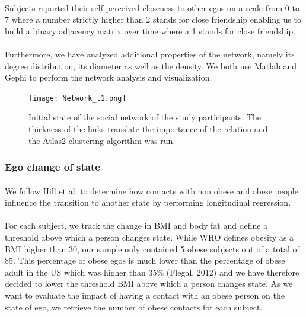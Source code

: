 \documentclass[11pt]{article}
\begin{document}
\paragraph{}
Subjects reported their self-perceived closeness to other egos on a scale from 0 to 7 where a number strictly higher than 2 stands for close friendship enabling us to build a binary adjacency matrix over time where a 1 stands for close friendship.

\paragraph{}

Furthermore, we have analyzed additional properties of the network, namely its degree distribution, its diameter as well as the density. We both use Matlab and Gephi to perform the network analysis and visualization.

\begin{figure}[!ht]
\center
   \texttt{[image: Network\_t1.png]}
   \caption{\label{4} Initial state of the social network of the study participants. The thickness of the links translate the importance of the relation and the Atlas2 clustering algorithm was run.}
\end{figure}

\subsubsection{Ego change of state}
\paragraph{}
We follow Hill et al. to determine how contacts with non obese and obese people influence the transition to another state by performing longitudinal regression. 
\paragraph{}
For each subject, we track the change in BMI and body fat and define a threshold above which a person changes state. While WHO defines obesity as a BMI higher than 30, our sample only contained 5 obese subjects out of a total of 85. This percentage of obese egos is much lower than the percentage of obese adult in the US which was higher than 35\% (Flegal, 2012) and we have therefore decided to lower the threshold BMI above which a person changes state. As we want to evaluate the impact of having a contact with an obese person  on the state of ego, we retrieve the number of obese contacts for each subject.
\end{document}

